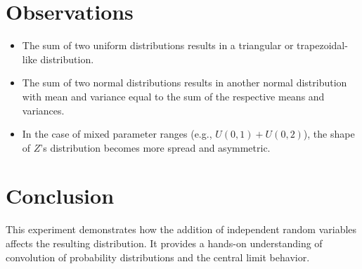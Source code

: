 \documentclass[12pt]{article}
\begin{document}
\section*{Observations}
\begin{itemize}
  \item The sum of two uniform distributions results in a triangular or trapezoidal-like distribution.
  \item The sum of two normal distributions results in another normal distribution with mean and variance equal to the sum of the respective means and variances.
  \item In the case of mixed parameter ranges (e.g., \( U(0,1) + U(0,2) \)), the shape of \( Z \)'s distribution becomes more spread and asymmetric.
\end{itemize}

\section*{Conclusion}
This experiment demonstrates how the addition of independent random variables affects the resulting distribution. It provides a hands-on understanding of convolution of probability distributions and the central limit behavior.
\end{document}
